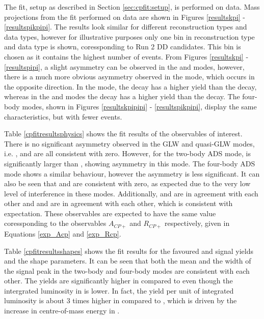 The \CP fit, setup as described in Section \ref{sec:cpfit:setup}, is performed on data. Mass projections from the \CP fit performed on data are shown in Figures \ref{resultskpi} - \ref{resultspikpipi}. The results look similar for different \KS reconstruction types and data types, however for illustrative purposes only one bin in \KS reconstruction type and data type is shown, coressponding to Run 2 DD candidates. This bin is chosen as it contains the highest number of events. From Figures \ref{resultskpi} - \ref{resultspipi}, a slight asymmetry can be observed in the \kk and \pipi modes, however, there is a much more obvious asymmetry observed in the \pik mode, which occurs in the opposite direction. In the \pik mode, the \Bp decay has a higher yield than the \Bm decay, whereas in the \kk and \pipi modes the \Bm decay has a higher yield than the \Bp decay. The four-body modes, shown in Figures \ref{resultskpipipi} - \ref{resultspikpipi}, display the same characteristics, but with fewer events.

Table \ref{cpfitresultsphysics} shows the \CP fit results of the \CP observables of interest. There is no significant asymmetry observed in the GLW and quasi-GLW modes, i.e. \Akk, \Apipi and \Apipipipi are all consistent with zero. However, for the two-body ADS mode, \Rptwo is significantly larger than \Rmtwo, showing asymmetry in this mode. The four-body ADS mode shows a similar behaviour, however the asymmetry is less significant. It can also be seen that \Akpi and \Akpipipi are consistent with zero, as expected due to the very low level of interference in these modes. Additionally, \Akk and \Apipi are in agreement with each other and \Rkk and \Rpipi are in agreement with each other, which is consistent with expectation. These \CP observables are expected to have the same value coressponding to the observables $A_{CP+}$ and $R_{CP+}$ respectively, given in Equations \ref{exp_Acp} and \ref{exp_Rcp}.

Table \ref{cpfitresultsshapes} shows the fit results for the favoured \kpi and \kpipipi signal yields and the shape parameters. It can be seen that both the mean and the width of the signal peak in the two-body and four-body modes are consistent with each other. The yields are significantly higher in \runtwo compared to \runone even though the intergrated luminosity in \runtwo is lower. In fact, the yield per unit of integrated luminosity is about 3 times higher in \runone compared to \runtwo, which is driven by the increase in centre-of-mass energy in \runtwo.

